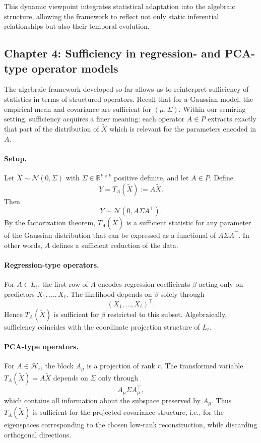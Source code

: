 This dynamic viewpoint integrates statistical adaptation into the algebraic structure, allowing the framework to reflect not only static inferential relationships but also their temporal evolution.


\subsection{Chapter 4: Sufficiency in regression- and PCA-type operator models}
\label{subsec:sufficiency}

The algebraic framework developed so far allows us to reinterpret sufficiency of statistics in terms of structured operators. Recall that for a Gaussian model, the empirical mean and covariance are sufficient for $(\mu,\Sigma)$. Within our semiring setting, sufficiency acquires a finer meaning: each operator $A \in P$ extracts exactly that part of the distribution of $\tilde{X}$ which is relevant for the parameters encoded in $A$.

\paragraph{Setup.}  
Let $\tilde{X} \sim \mathcal{N}(0, \Sigma)$ with $\Sigma \in \mathbb{R}^{k \times k}$ positive definite, and let $A \in P$. Define
\[
Y = T_A(\tilde{X}) := A \tilde{X}.
\]
Then
\[
Y \sim \mathcal{N}(0, A \Sigma A^\top).
\]
By the factorization theorem, $T_A(\tilde{X})$ is a sufficient statistic for any parameter of the Gaussian distribution that can be expressed as a functional of $A \Sigma A^\top$. In other words, $A$ defines a sufficient reduction of the data.

\paragraph{Regression-type operators.}  
For $A \in L_\ell$, the first row of $A$ encodes regression coefficients $\beta$ acting only on predictors $X_1,\dots,X_\ell$. The likelihood depends on $\beta$ solely through
\[
(X_1, \dots, X_\ell)^\top.
\]
Hence $T_A(\tilde{X})$ is sufficient for $\beta$ restricted to this subset. Algebraically, sufficiency coincides with the coordinate projection structure of $L_\ell$.

\paragraph{PCA-type operators.}  
For $A \in \mathcal{H}_r$, the block $A_\mu$ is a projection of rank $r$. The transformed variable $T_A(\tilde{X}) = A \tilde{X}$ depends on $\Sigma$ only through
\[
A_\mu \Sigma A_\mu^\top,
\]
which contains all information about the subspace preserved by $A_\mu$. Thus $T_A(\tilde{X})$ is sufficient for the projected covariance structure, i.e., for the eigenspaces corresponding to the chosen low-rank reconstruction, while discarding orthogonal directions.

